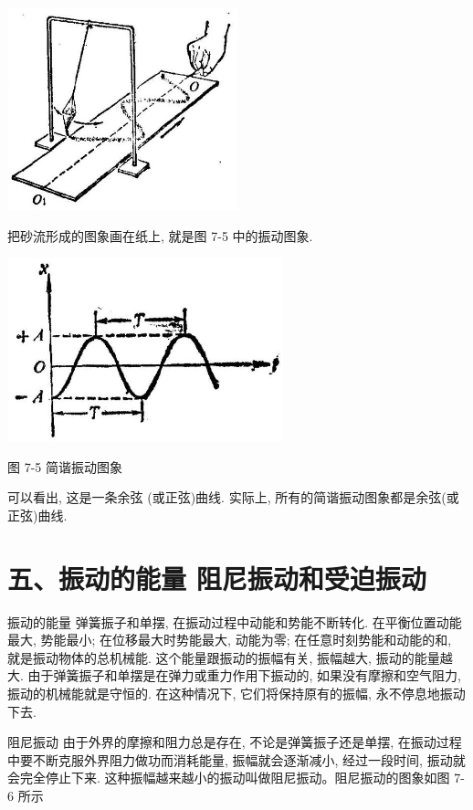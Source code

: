 \documentclass[10pt]{article}
\begin{document}
\begin{center}
\includegraphics[max width=0.5\textwidth]{images/01912d55-147c-70aa-b0e0-1782a122f948_199_918656.jpg}
\end{center}

把砂流形成的图象画在纸上, 就是图 7-5 中的振动图象.

\begin{center}
\includegraphics[max width=0.6\textwidth]{images/01912d55-147c-70aa-b0e0-1782a122f948_200_755973.jpg}
\end{center}

图 7-5 简谐振动图象

可以看出, 这是一条余弦 (或正弦)曲线. 实际上, 所有的简谐振动图象都是余弦(或正弦)曲线.

\section*{五、振动的能量 阻尼振动和受迫振动}

振动的能量 弹簧振子和单摆, 在振动过程中动能和势能不断转化. 在平衡位置动能最大, 势能最小; 在位移最大时势能最大, 动能为零; 在任意时刻势能和动能的和, 就是振动物体的总机械能. 这个能量跟振动的振幅有关, 振幅越大, 振动的能量越大. 由于弹簧振子和单摆是在弹力或重力作用下振动的, 如果没有摩擦和空气阻力, 振动的机械能就是守恒的. 在这种情况下, 它们将保持原有的振幅, 永不停息地振动下去.

阻尼振动 由于外界的摩擦和阻力总是存在, 不论是弹簧振子还是单摆, 在振动过程中要不断克服外界阻力做功而消耗能量, 振幅就会逐渐减小, 经过一段时间, 振动就会完全停止下来. 这种振幅越来越小的振动叫做阻尼振动。阻尼振动的图象如图 7-6 所示
\end{document}
